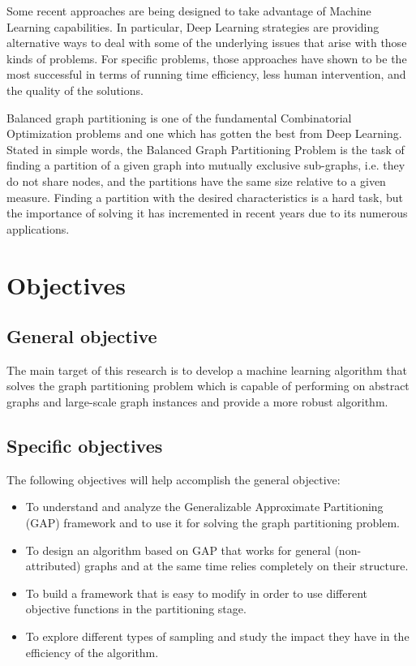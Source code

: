 Some recent approaches are being designed to take advantage of Machine Learning capabilities. In particular, Deep Learning strategies are providing alternative ways to deal with some of the underlying issues that arise with those kinds of problems. For specific problems, those approaches have shown to be the most successful in terms of running time efficiency, less human intervention, and the quality of the solutions.

Balanced graph partitioning is one of the fundamental Combinatorial Optimization problems and one which has gotten the best from Deep Learning. Stated in simple words, the Balanced Graph Partitioning Problem is the task of finding a partition of a given graph into mutually exclusive sub-graphs, i.e. they do not share nodes, and the partitions have the same size relative to a given measure. Finding a partition with the desired characteristics is a hard task, but the importance of solving it has incremented in recent years due to its numerous applications.

\section{Objectives}

\subsection{General objective}
    The main target of this research is to develop a machine learning algorithm that solves the graph partitioning problem which is capable of performing on abstract graphs and large-scale graph instances and provide a more robust algorithm.
\subsection{Specific objectives}
The following objectives will help accomplish the general objective:
\begin{itemize}
    \item To understand and analyze the Generalizable Approximate Partitioning (GAP) framework and to use it for solving the graph partitioning problem.
    \item To design an algorithm based on GAP that works for general (non-attributed) graphs and at the same time relies completely on their structure.
    \item To build a framework that is easy to modify in order to use different objective functions in the partitioning stage.
    \item To explore different types of sampling and study the impact they have in the efficiency of the algorithm.
\end{itemize}


